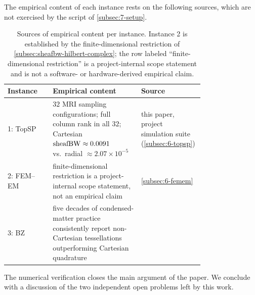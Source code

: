 The empirical content of each instance rests on the following sources,
which are not exercised by the script of \cref{subsec:7-setup}.

\begin{table}[h]
\centering
\small
\begin{tabular}{@{}l p{0.45\linewidth} p{0.32\linewidth}@{}}
\toprule
\textbf{Instance} & \textbf{Empirical content} & \textbf{Source} \\
\midrule
1: TopSP    & $32$ MRI sampling configurations; full column rank in all $32$;
              Cartesian $\operatorname{sheafBW} \approx 0.0091$ vs.\ radial $\approx 2.07 \times 10^{-5}$
            & this paper, project simulation suite (\cref{subsec:6-topsp}) \\
2: FEM--EM  & finite-dimensional restriction is a project-internal scope
              statement, not an empirical claim
            & \cref{subsec:6-femem} \\
3: BZ       & five decades of condensed-matter practice consistently report
              non-Cartesian tessellations outperforming Cartesian quadrature
            & \cite{Blochl1994,LehmannTaut1972,JepsenAndersen1971,MonkhorstPack1976} \\
\bottomrule
\end{tabular}
\caption{Sources of empirical content per instance. Instance 2 is
  established by the finite-dimensional restriction of
  \cref{subsec:sheafbw-hilbert-complex}; the row labeled ``finite-dimensional
  restriction'' is a project-internal scope statement and is not a
  software- or hardware-derived empirical claim.}
\label{tab:7-evidence}
\end{table}

\noindent
The numerical verification closes the main argument of the paper. We
conclude with a discussion of the two independent open problems left
by this work.
